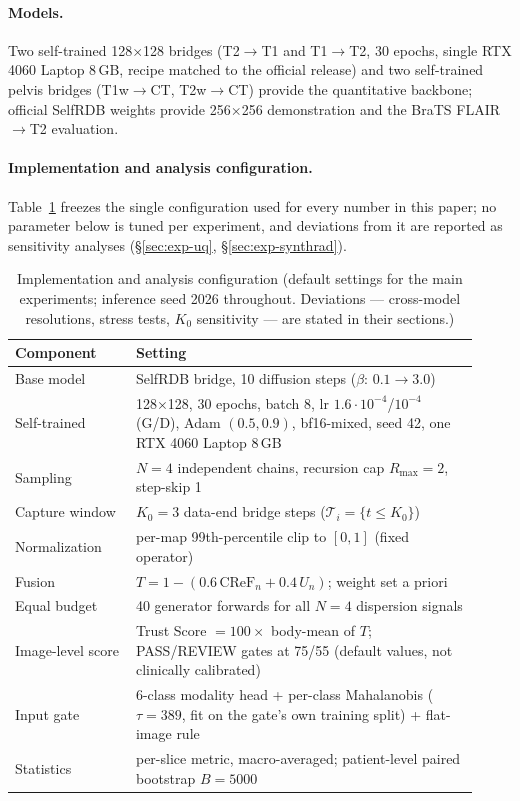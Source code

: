 \documentclass[11pt]{article}
\begin{document}
\paragraph{Models.}
Two self-trained 128$\times$128 bridges (T2$\to$T1 and T1$\to$T2, 30 epochs,
single RTX 4060 Laptop 8\,GB, recipe matched to the official release) and two
self-trained pelvis bridges (T1w$\to$CT, T2w$\to$CT) provide the quantitative
backbone; official SelfRDB weights provide 256$\times$256 demonstration and
the BraTS FLAIR$\to$T2 evaluation.
\paragraph{Implementation and analysis configuration.}
Table~\ref{tab:impl} freezes the single configuration used for every number
in this paper; no parameter below is tuned per experiment, and deviations
from it are reported as sensitivity analyses (\S\ref{sec:exp-uq},
\S\ref{sec:exp-synthrad}).
\begin{table}[t]
\centering\small
\caption{Implementation and analysis configuration (default settings for the
main experiments; inference seed 2026 throughout. Deviations --- cross-model
resolutions, stress tests, $K_0$ sensitivity --- are stated in their sections.)}
\label{tab:impl}
\begin{tabular}{p{0.24\linewidth}p{0.68\linewidth}}
\toprule
Component & Setting \\
\midrule
Base model & SelfRDB bridge, 10 diffusion steps ($\beta$: $0.1\to3.0$) \\
Self-trained & 128$\times$128, 30 epochs, batch 8, lr $1.6\cdot10^{-4}$/$10^{-4}$ (G/D), Adam $(0.5,0.9)$, bf16-mixed, seed 42, one RTX 4060 Laptop 8\,GB \\
Sampling & $N{=}4$ independent chains, recursion cap $R_{\max}{=}2$, step-skip 1 \\
Capture window & $K_0{=}3$ data-end bridge steps ($\mathcal T_i{=}\{t\le K_0\}$) \\
Normalization & per-map 99th-percentile clip to $[0,1]$ (fixed operator) \\
Fusion & $T = 1-(0.6\,\mathrm{CReF}_n + 0.4\,U_n)$; weight set a priori \\
Equal budget & 40 generator forwards for all $N{=}4$ dispersion signals \\
Image-level score & Trust Score $=100\times$ body-mean of $T$; PASS/REVIEW gates at 75/55 (default values, not clinically calibrated) \\
Input gate & 6-class modality head + per-class Mahalanobis ($\tau{=}389$, fit on the gate's own training split) + flat-image rule \\
Statistics & per-slice metric, macro-averaged; patient-level paired bootstrap $B{=}5000$ \\
\bottomrule
\end{tabular}
\end{table}
\end{document}
